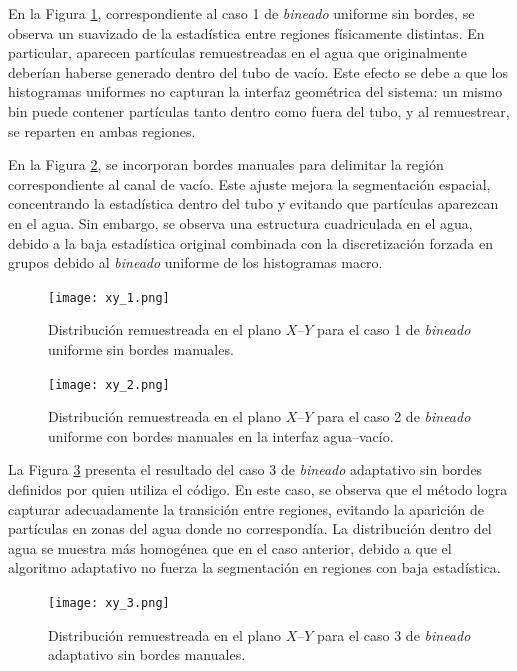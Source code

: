 En la Figura \ref{fig:xy_1}, correspondiente al caso 1 de \textit{bineado} uniforme sin bordes, se observa un suavizado de la estadística entre regiones físicamente distintas. En particular, aparecen partículas remuestreadas en el agua que originalmente deberían haberse generado dentro del tubo de vacío. Este efecto se debe a que los histogramas uniformes no capturan la interfaz geométrica del sistema: un mismo bin puede contener partículas tanto dentro como fuera del tubo, y al remuestrear, se reparten en ambas regiones.

En la Figura \ref{fig:xy_2}, se incorporan bordes manuales para delimitar la región correspondiente al canal de vacío. Este ajuste mejora la segmentación espacial, concentrando la estadística dentro del tubo y evitando que partículas aparezcan en el agua. Sin embargo, se observa una estructura cuadriculada en el agua, debido a la baja estadística original combinada con la discretización forzada en grupos debido al \textit{bineado} uniforme de los histogramas macro.

\begin{figure}[H]
    \centering
    \texttt{[image: xy\_1.png]}
    \caption{Distribución remuestreada en el plano $X$–$Y$ para el caso 1 de \textit{bineado} uniforme sin bordes manuales.}
    \label{fig:xy_1}
\end{figure}

\begin{figure}[H]
    \centering
    \texttt{[image: xy\_2.png]}
    \caption{Distribución remuestreada en el plano $X$–$Y$ para el caso 2 de \textit{bineado} uniforme con bordes manuales en la interfaz agua–vacío.}
    \label{fig:xy_2}
\end{figure}

La Figura \ref{fig:xy_3} presenta el resultado del caso 3 de \textit{bineado} adaptativo sin bordes definidos por quien utiliza el código. En este caso, se observa que el método logra capturar adecuadamente la transición entre regiones, evitando la aparición de partículas en zonas del agua donde no correspondía. La distribución dentro del agua se muestra más homogénea que en el caso anterior, debido a que el algoritmo adaptativo no fuerza la segmentación en regiones con baja estadística.

\begin{figure}[H]
    \centering
    \texttt{[image: xy\_3.png]}
    \caption{Distribución remuestreada en el plano $X$–$Y$ para el caso 3 de \textit{bineado} adaptativo sin bordes manuales.}
    \label{fig:xy_3}
\end{figure}

